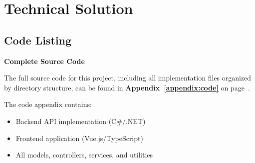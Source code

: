 \chapter{Technical Solution}


\section{Code Listing}

\begin{tcolorbox}[
    colback=blue!5!white,
    colframe=blue!75!black,
    arc=2mm,
    boxrule=0.5pt,
    left=6pt,
    right=6pt,
    top=6pt,
    bottom=6pt
]
\textbf{Complete Source Code}

The full source code for this project, including all implementation files organized by directory structure, can be found in \textbf{Appendix~\ref{appendix:code}} on page~\pageref{appendix:code}.

The code appendix contains:
\begin{itemize}
    \item Backend API implementation (C\#/.NET)
    \item Frontend application (Vue.js/TypeScript)
    \item All models, controllers, services, and utilities
\end{itemize}
\end{tcolorbox}
